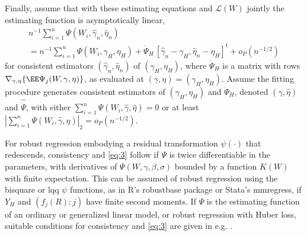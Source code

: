 \sloppy
Finally, assume that with these estimating equations and $\mathcal{L}(W)$
jointly the estimating function is asymptotically linear,
\begin{multline} \label{eq:3}
n^{-1}\sum_{i=1}^n \Psi(W_i, \hat{\gamma}_{n}, \hat{\eta}_{n}) \\=
n^{-1}\sum_{i=1}^n \Psi(W_i, \gamma_H, \eta_H) +
\dot{\Psi}_H \, [\hat{\gamma}_{n} -\gamma_H, \hat{\eta}_{n} - \eta_H]^{t}
+ o_{P}(n^{-1/2})
\end{multline}
for consistent estimators $(\hat{\gamma}_{n}, \hat{\eta}_{n})$ of $(\gamma_H, \eta_H)$,
where $\dot{\Psi}_H$ is a matrix with rows $\nabla_{\gamma, \eta} \{\EE
\Psi_{j}(W, \gamma, \eta) \}$, as evaluated at ${(\gamma, \eta) = (\gamma_{H},
  \eta_{H})}$.   Assume the fitting procedure generates
consistent estimators of $(\gamma_H, \eta_H)$ and $\dot{\Psi}_H$,
denoted $(\hat\gamma, \hat\eta)$ and
$\hat{\dot{\Psi}}$, with either $\sum_{i=1}^{n}\Psi(W_i, \hat{\gamma},
\hat{\eta}) = 0 $  or at least  $|\sum_{i=1}^{n}\Psi(W_i, \hat{\gamma},
\hat{\eta}) |_{2} = o_{P}(n^{-1/2})$.

For robust regression embodying a residual transformation
$\psi (\cdot )$ that redescends, consistency and \eqref{eq:3} follow
if $\Psi$ is twice differentiable in the parameters, with derivatives
of $\Psi(W, \gamma, \beta, \sigma)$ bounded by a function $K(W)$ with
finite expectation.  This can be assumed of robust regression using
the bisquare or lqq $\psi$ functions, as in R's robustbase package or
Stata's mmregress, if ${Y_H}$ and $(f_j(R) : j)$ have finite
second moments.  If $\Psi$ is the estimating function of an ordinary
or generalized linear model, or robust regression with Huber loss,
suitable conditions for consistency and \eqref{eq:3} are given in
e.g. \citet{he2000parameters}.

